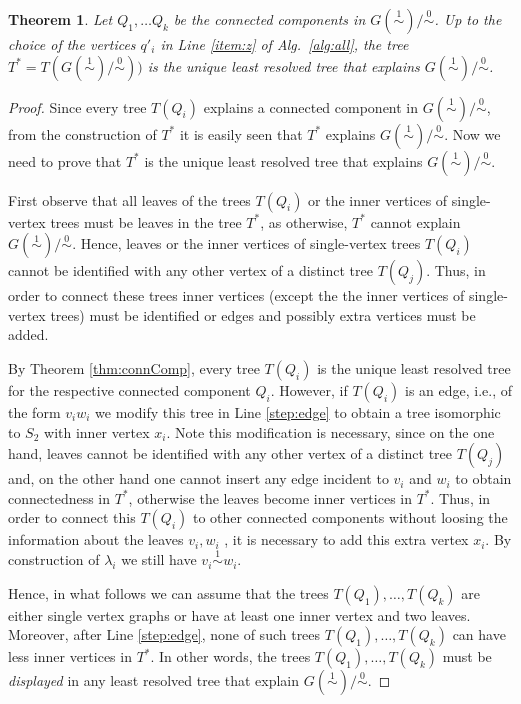 \documentclass[smallextended]{svjour3}
\newcommand{\Ro}{\mathrel{\overset{0}{\sim}}}
\newcommand{\Rl}{\mathrel{\overset{1}{\sim}}}
\newtheorem{thm}{Theorem}
\begin{document}
\begin{thm}
  Let $Q_1,\dots Q_k$ be the connected components in $G(\Rl)/\Ro$.  Up to
  the choice of the vertices $q'_i$ in Line \ref{item:z} of Alg.\
  \ref{alg:all}, the tree $T^* = T(G(\Rl)/\Ro))$ is the unique least
  resolved tree that explains $G(\Rl)/\Ro$.
  \label{thm:star-tree}
\end{thm}
\begin{proof}
  Since every tree $T(Q_i)$ explains a connected component in $G(\Rl)/\Ro$,
  from the construction of $T^*$ it is easily seen that $T^*$ explains
  $G(\Rl)/\Ro$.  Now we need to prove that $T^*$ is the unique least resolved
  tree that explains $G(\Rl)/\Ro$.
        
  First observe that all leaves of the trees $T(Q_i)$ or the inner vertices
  of single-vertex trees must be leaves in the tree $T^*$, as otherwise,
  $T^*$ cannot explain $G(\Rl)/\Ro$.  Hence, leaves or the inner vertices
  of single-vertex trees $T(Q_i)$ cannot be identified with any other
  vertex of a distinct tree $T(Q_j)$.  Thus, in order to connect these
  trees inner vertices (except the the inner vertices of single-vertex
  trees) must be identified or edges and possibly extra vertices must be
  added.

  By Theorem \ref{thm:connComp}, every tree $T(Q_i)$ is the unique least
  resolved tree for the respective connected component $Q_i$.  However, if
  $T(Q_i)$ is an edge, i.e., of the form $v_iw_i$ we modify this tree in
  Line \ref{step:edge} to obtain a tree isomorphic to $S_2$ with inner
  vertex $x_i$.  Note this modification is necessary, since on the one
  hand, leaves cannot be identified with any other vertex of a distinct
  tree $T(Q_j)$ and, on the other hand one cannot insert any edge incident
  to $v_i$ and $w_i$ to obtain connectedness in $T^*$, otherwise the leaves
  become inner vertices in $T^*$. Thus, in order to connect this $T(Q_i)$
  to other connected components without loosing the information about the
  leaves $v_i,w_i$ , it is necessary to add this extra vertex $x_i$.  By
  construction of $\lambda_i$ we still have $v_i\Rl w_i$.

  Hence, in what follows we can assume that the trees $T(Q_1),\dots,T(Q_k)$
  are either single vertex graphs or have at least one inner vertex and two
  leaves.  Moreover, after Line \ref{step:edge}, none of such trees
  $T(Q_1),\dots,T(Q_k)$ can have less inner vertices in $T^*$. In other
  words, the trees $T(Q_1),\dots,T(Q_k)$ must be \emph{displayed} in any
  least resolved tree that explain $G(\Rl)/\Ro$.
        

\end{proof}
\end{document}

